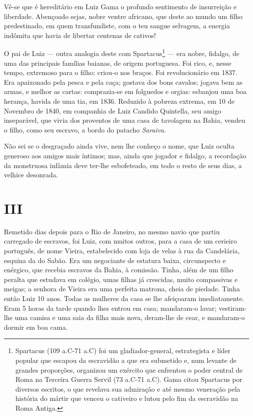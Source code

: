 Vê-se que é hereditário em Luiz Gama o profundo sentimento de
insurreição e liberdade. Abençoado sejas, nobre ventre africano, que
deste ao mundo um filho predestinado, em quem transfundiste, com o teu
sangue selvagem, a energia indômita que havia de libertar centenas de
cativos!

O pai de Luiz --- outra analogia deste com Spartacus\footnote{
  Spartacus (109 a.C-71 a.C) foi um gladiador-general, estrategista e
  líder popular que escapou da escravidão a que era submetido e, num
  levante de grandes proporções, organizou um exército que enfrentou o
  poder central de Roma na Terceira Guerra Servil (73 a.C-71 a.C). Gama
  citou Spartacus por diversos escritos, o que revelava sua admiração e
  até mesmo veneração pela história do mártir que venceu o cativeiro e
  lutou pelo fim da escravidão na Roma Antiga.} --- era nobre, fidalgo,
de uma das principais famílias baianas, de origem portuguesa. Foi rico,
e, nesse tempo, extremoso para o filho: criou-o nos braços. Foi
revolucionário em 1837. Era apaixonado pela pesca e pela caça; gostava
dos bons cavalos; jogava bem as armas, e melhor as cartas: comprazia-se
em folguedos e orgias: esbanjou uma boa herança, havida de uma tia, em
1836. Reduzido à pobreza extrema, em 10 de Novembro de 1840, em
companhia de Luiz Candido Quintella, seu amigo inseparável, que vivia
dos proventos de uma casa de tavolagem na Bahia, vendeu o filho, como
seu escravo, a bordo do patacho \emph{Saraiva}.

Não sei se o desgraçado ainda vive, nem lhe conheço o nome, que Luiz
oculta generoso aos amigos mais íntimos; mas, ainda que jogador e
fidalgo, a recordação da monstruosa infâmia deve ter-lhe esbofeteado, em
todo o resto de seus dias, a velhice desonrada.

\section*{III}

Remetido dias depois para o Rio de Janeiro, no mesmo navio que partiu
carregado de escravos, foi Luiz, com muitos outros, para a casa de um
cerieiro português, de nome Vieira, estabelecido com loja de velas à rua
da Candelária, esquina da do Sabão. Era um negociante de estatura baixa,
circunspecto e enérgico, que recebia escravos da Bahia, à comissão.
Tinha, além de um filho peralta que estudava em colégio, umas filhas já
crescidas, muito compassivas e meigas; a senhora de Vieira era uma
perfeita matrona, cheia de piedade. Tinha então Luiz 10 anos. Todas as
mulheres da casa se lhe afeiçoaram imediatamente. Eram 5 horas da tarde
quando lhes entrou em casa; mandaram-o lavar; vestiram-lhe uma camisa e
uma saia da filha mais nova, deram-lhe de cear, e mandaram-o dormir em
boa cama.

